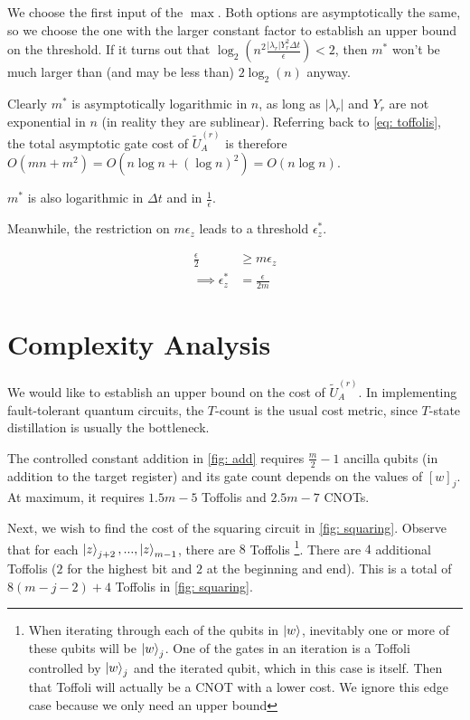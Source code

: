 We choose the first input of the $\max$. Both options are asymptotically the same, so we choose the one with the larger constant factor to establish an upper bound on the threshold. If it turns out that $\log_2\left(n^2\frac{|\lambda_r|Y_r^2\Delta t}{\epsilon}\right) < 2$, then $m^*$ won't be much larger than (and may be less than) $2\log_2(n)$ anyway.

Clearly $m^*$ is asymptotically logarithmic in $n$, as long as $|\lambda_r|$ and $Y_r$ are not exponential in $n$ (in reality they are sublinear). Referring back to \eqref{eq: toffolis}, the total asymptotic gate cost of $\tilde{U}_A^{(r)}$ is therefore $O(mn + m^2) = O(n\log{n} + (\log{n})^2) = O(n\log{n})$.

$m^*$ is also logarithmic in $\Delta t$ and in $\frac{1}{\epsilon}$.

Meanwhile, the restriction on $m\epsilon_z$ leads to a threshold $\epsilon_z^*$.

\begin{equation}
    \begin{split}
        \frac{\epsilon}{2} &\geq m\epsilon_z \\
        \implies \epsilon_z^* &= \frac{\epsilon}{2m} \label{eq: e_z}
    \end{split}
\end{equation}

\section{Complexity Analysis}

We would like to establish an upper bound on the cost of $\tilde{U}_A^{(r)}$. In implementing fault-tolerant quantum circuits, the $T$-count is the usual cost metric, since $T$-state distillation is usually the bottleneck.

The controlled constant addition in \ref{fig: add} requires $\frac{m}{2} - 1$ ancilla qubits (in addition to the target register) and its gate count depends on the values of $[w]_j$. At maximum, it requires $1.5m - 5$ Toffolis and $2.5m - 7$ CNOTs.

Next, we wish to find the cost of the squaring circuit in \ref{fig: squaring}. Observe that for each $\ket{z}_{j + 2}, ..., \ket{z}_{m - 1}$, there are $8$ Toffolis \footnote{When iterating through each of the qubits in $\ket{w}$, inevitably one or more of these qubits will be $\ket{w}_j$. One of the gates in an iteration is a Toffoli controlled by $\ket{w}_j$ and the iterated qubit, which in this case is itself. Then that Toffoli will actually be a CNOT with a lower cost. We ignore this edge case because we only need an upper bound}. There are $4$ additional Toffolis ($2$ for the highest bit and $2$ at the beginning and end). This is a total of $8(m - j - 2) + 4$ Toffolis in \ref{fig: squaring}.

